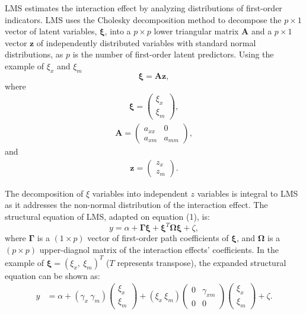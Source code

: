 \documentclass[
  man]{apa7}
\begin{document}
LMS estimates the interaction effect by analyzing distributions of first-order indicators. LMS uses the Cholesky decomposition method to decompose the \(p \times 1\) vector of latent variables, \(\mathbf{\xi}\), into a \(p \times p\) lower triangular matrix \(\mathbf{A}\) and a \(p \times 1\) vector \(\mathbf{z}\) of independently distributed variables with standard normal distributions, as \(p\) is the number of first-order latent predictors. Using the example of \(\xi_{x}\) and \(\xi_{m}\)
\begin{equation}
\mathbf{\xi} = \mathbf{A}\mathbf{z},
\end{equation}
where
\begin{align}
  \mathbf{\xi} =   
    \begin{pmatrix}
        \xi_{x} \\
        \xi_{m}
      \end{pmatrix},
\end{align}
\begin{align}
  \mathbf{A} =   
    \begin{pmatrix}
        a_{xx} & 0 \\
        a_{xm} & a_{mm}
      \end{pmatrix},
\end{align}
and
\begin{align}
  \mathbf{z} =   
    \begin{pmatrix}
        z_{x} \\
        z_{m}
      \end{pmatrix}.
\end{align}

The decomposition of \(\xi\) variables into independent \(z\) variables is integral to LMS as it addresses the non-normal distribution of the interaction effect. The structural equation of LMS, adapted on equation (1), is:
\begin{equation}
y = \alpha + \mathbf{\Gamma}\mathbf{\xi} + \mathbf{\xi}^T\mathbf{\Omega}\mathbf{\xi} + \zeta,
\end{equation}
where \(\mathbf{\Gamma}\) is a \((1 \times p)\) vector of first-order path coefficients of \(\mathbf{\xi}\), and \(\mathbf{\Omega}\) is a \((p \times p)\) upper-diagnol matrix of the interaction effects' coefficients. In the example of \(\mathbf{\xi} = (\xi_{x}, \ \xi_{m})^T\) (\(T\) represents transpose), the expanded structural equation can be shown as:
\begin{align}
    y &= \alpha + (\gamma_{x} \ \gamma_{m})
        \begin{pmatrix}
          \xi_{x} \\           
          \xi_{m}
        \end{pmatrix} +
        (\xi_{x} \ \xi_{m})
        \begin{pmatrix}
          0 & \gamma_{xm} \\           
          0 & 0
        \end{pmatrix}
        \begin{pmatrix}
          \xi_{x} \\           
          \xi_{m}
        \end{pmatrix} + 
    \zeta.
  \end{align}
\end{document}
